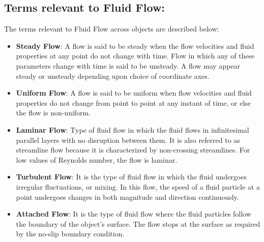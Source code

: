 \documentclass[12pt,a4paper]{article}
\begin{document}
\subsection{Terms relevant to Fluid Flow:}
The terms relevant to Fluid Flow across objects are described below:
\begin{itemize}
\item \textbf{Steady Flow}: A flow is said to be steady when the flow velocities and fluid properties at any point do not change with time. Flow in which any of these parameters change with time is said to be unsteady. A flow may appear steady or unsteady depending upon choice of coordinate axes.
\item \textbf{Uniform Flow}: A flow is said to be uniform when flow velocities and fluid properties do not change from point to point at any instant of time, or else the flow is non-uniform.
\item \textbf{Laminar Flow}: Type of fluid flow in which the fluid flows in infinitesimal parallel layers with no disruption between them. It is also referred to as streamline flow because it is characterized by non-crossing streamlines. For low values of Reynolds number, the flow is laminar.
\item \textbf{Turbulent Flow}: It is the type of fluid flow in which the fluid undergoes irregular fluctuations, or mixing. In this flow, the speed of a fluid particle at a point undergoes changes in both magnitude and direction continuously.
\item \textbf{Attached Flow}: It is the type of fluid flow where the fluid particles follow the boundary of the object’s surface. The flow stops at the surface as required by the no-slip boundary condition. 
\end{itemize}
\end{document}
